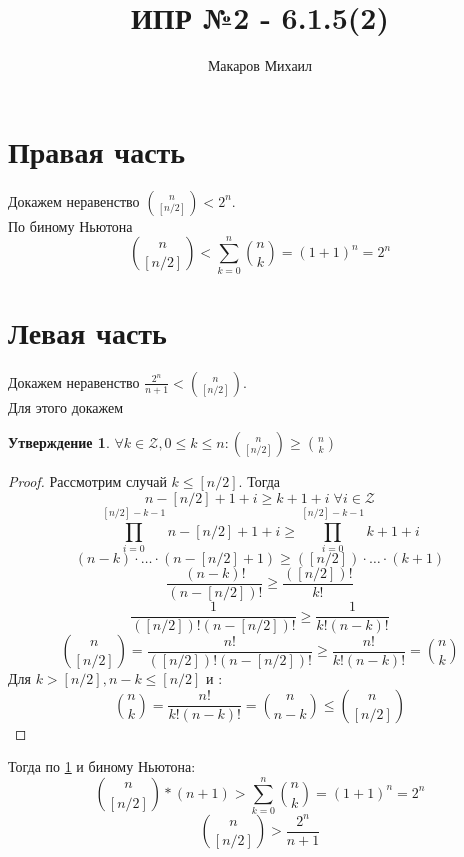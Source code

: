 \documentclass{article}
\title{ИПР №2 - 6.1.5(2)}
\author{Макаров Михаил}
\date{}
\newtheorem{prop}{Утверждение}
\begin{document}
	\maketitle
	\section{Правая часть}
    Докажем неравенство $\binom{n}{[n/2]} < 2^n$.\\
    По биному Ньютона
    \[
       \binom{n}{[n/2]} < \sum_{k=0}^{n} \binom{n}{k} = (1 + 1) ^ n = 2 ^ n
    \]
    \section{Левая часть}
    Докажем неравенство $ \frac{2^n}{n + 1} < \binom{n}{[n/2]} $.\\
    Для этого докажем
    \begin{prop}
    \label{ut1}
         $\forall k \in \mathcal{Z}, 0 \leq k \leq n: \binom{n}{[n/2]} \geq \binom{n}{k} $
    \end{prop}
    \begin{proof} 
    Рассмотрим случай $k \leq [n/2]$. Тогда
    \[
        n - [n/2] + 1 + i \geq k + 1 + i\; \forall i \in \mathcal{Z}
    \]
    \[
        \prod_{i = 0}^{[n/2] - k - 1} n - [n/2] + 1 + i \geq \prod_{i = 0}^{[n/2] - k - 1} k + 1 + i
    \]
    \[
        (n - k)\cdot \ldots \cdot (n - [n/2] + 1) \geq ([n/2]) \cdot \ldots \cdot (k + 1)
    \]
    \[
        \frac{(n-k)!}{(n - [n/2])!} \geq \frac{([n/2])!}{k!}
    \]
    \[
        \frac{1}{([n/2])!(n - [n/2])!} \geq \frac{1}{k!(n-k)!}
    \]
    \[
        \binom{n}{[n/2]} = \frac{n!}{([n/2])!(n - [n/2])!} \geq \frac{n!}{k!(n-k)!} = \binom{n}{k}
    \]
    Для $k > [n/2], n - k \leq [n/2]$ и :
    \[
        \binom{n}{k} = \frac{n!}{k!(n-k)!} = \binom{n}{n - k} \leq \binom{n}{[n/2]}
    \]
    \end{proof}    
    Тогда по \ref{ut1} и биному Ньютона:\\
    \[
        \binom{n}{[n/2]} * (n + 1) > \sum_{k=0}^{n} \binom{n}{k} = (1 + 1) ^ n = 2 ^ n
    \]
    \[
        \binom{n}{[n/2]} > \frac{2 ^ n}{n + 1}
    \]
\end{document}
